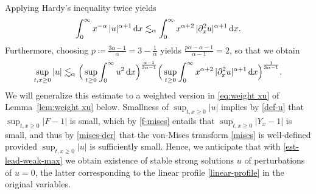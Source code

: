\documentclass[reqno,12pt]{amsart}
\renewcommand{\d}{\ensuremath{\mathrm{d}}}
\renewcommand{\d}{\ensuremath{{\rm d}}}
\numberwithin{equation}{section}
\begin{document}
%
Applying Hardy's inequality twice yields
%
\[
\int_0^\infty x^{-\alpha} \, |u|^{\alpha+1} \, \d x \lesssim_\alpha \int_0^\infty x^{\alpha+2} \, |\partial_x^2 u|^{\alpha+1} \, \d x.
\]
%
Furthermore, choosing $p \coloneq \frac{3\alpha-1}{\alpha} = 3 - \frac 1 \alpha$ yields $\frac{p \alpha - \alpha - 1}{\alpha-1} = 2$, so that we obtain
%
\[
\sup_{t, x \ge 0} |u| \lesssim_\alpha \Big(\sup_{t \ge 0} \int_0^\infty u^2 \, \d x\Big)^{\frac{\alpha-1}{3\alpha-1}} \Big(\sup_{t \ge 0} \int_0^\infty x^{\alpha+2} \, |\partial_x^2 u|^{\alpha+1} \, \d x\Big)^{\frac{1}{3\alpha-1}}.
\]
%
We will generalize this estimate to a weighted version in \eqref{eq:weight xu} of Lemma~\ref{lem:weight xu} below.
Smallness of $\sup_{t, x \ge 0} |u|$ implies by \eqref{def-u} that $\sup_{t,x \ge 0} |F-1|$ is small, which by \eqref{f-mises} entails that $\sup_{t,x \ge 0} |Y_x-1|$ is small, and thus by \eqref{mises-der} that the von-Mises transform \eqref{mises} is well-defined provided $\sup_{t, x \ge 0} |u|$ is sufficiently small. Hence, we anticipate that with \eqref{est-lead-weak-max} we obtain existence of stable strong solutions $u$ of perturbations of $u = 0$, the latter corresponding to the linear profile \eqref{linear-profile} in the original variables.

%
\end{document}
